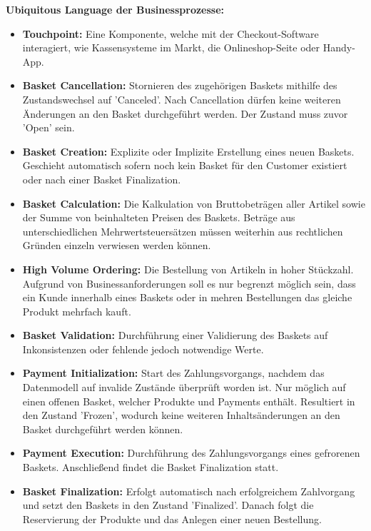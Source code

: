 \vspace{2em}

{\large \textbf{Ubiquitous Language der Businessprozesse:}}
\begin{itemize}[topsep=-3px]
	\item \textbf{Touchpoint: } { Eine Komponente, welche mit der Checkout-Software interagiert, wie Kassensysteme im Markt, die Onlineshop-Seite oder Handy-App.}
	\item \textbf{Basket Cancellation: } {Stornieren des zugehörigen Baskets mithilfe des Zustandswechsel auf 'Canceled'. Nach Cancellation dürfen keine weiteren Änderungen an den Basket durchgeführt werden. Der Zustand muss zuvor 'Open' sein. }
	\item \textbf{Basket Creation: } {Explizite oder Implizite Erstellung eines neuen Baskets. Geschieht automatisch sofern noch kein Basket für den Customer existiert oder nach einer Basket Finalization.}
	\item \textbf{Basket Calculation: } {Die Kalkulation von Bruttobeträgen aller Artikel sowie der Summe von beinhalteten Preisen des Baskets. Beträge aus unterschiedlichen Mehrwertsteuersätzen müssen weiterhin aus rechtlichen Gründen einzeln verwiesen werden können.}
	\item \textbf{High Volume Ordering: } {Die Bestellung von Artikeln in hoher Stückzahl. Aufgrund von Businessanforderungen soll es nur begrenzt möglich sein, dass ein Kunde innerhalb eines Baskets oder in mehren Bestellungen das gleiche Produkt mehrfach kauft.}
	\item \textbf{Basket Validation: } {Durchführung einer Validierung des Baskets auf Inkonsistenzen oder fehlende jedoch notwendige Werte.}
	\item \textbf{Payment Initialization: } {Start des Zahlungsvorgangs, nachdem das Datenmodell auf invalide Zustände überprüft worden ist. Nur möglich auf einen offenen Basket, welcher Produkte und Payments enthält. Resultiert in den Zustand 'Frozen', wodurch keine weiteren Inhaltsänderungen an den Basket durchgeführt werden können.}
	\item \textbf{Payment Execution: } {Durchführung des Zahlungsvorgangs eines gefrorenen Baskets. Anschließend findet die Basket Finalization statt.}
	\item \textbf{Basket Finalization: } {Erfolgt automatisch nach erfolgreichem Zahlvorgang und setzt den Baskets in den Zustand 'Finalized'. Danach folgt die Reservierung der Produkte und das Anlegen einer neuen Bestellung.}
\end{itemize}
\vspace{2em}


